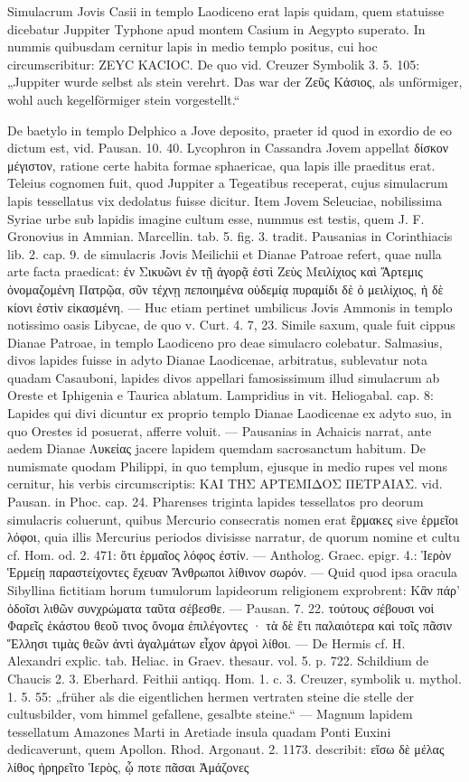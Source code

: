 \documentclass[a4paper, 11pt, oneside, polutonikogreek, german]{article}
\begin{document}
Simulacrum Jovis Casii in templo Laodiceno erat lapis quidam, quem statuisse dicebatur Juppiter Typhone apud montem Casium in Aegypto superato. In nummis quibusdam cernitur lapis in medio templo positus, cui hoc circumscribitur: ZEYC KACIOC. De quo vid. Creuzer Symbolik 3. 5. 105: „Juppiter wurde selbst als stein verehrt. Das war der Ζεῦς Κάσιος, als unförmiger, wohl auch kegelförmiger stein vorgestellt.“

De baetylo in templo Delphico a Jove deposito, praeter id quod in exordio de eo dictum est, vid. Pausan. 10. 40. Lycophron in Cassandra Jovem appellat δίσκον μέγιστον, ratione certe habita formae sphaericae, qua lapis ille praeditus erat. Teleius cognomen fuit, quod Juppiter a Tegeatibus receperat, cujus simulacrum lapis tessellatus vix dedolatus fuisse dicitur. Item Jovem Seleuciae, nobilissima Syriae urbe sub lapidis imagine cultum esse, nummus est testis, quem J. F. Gronovius in Ammian. Marcellin. tab. 5. fig. 3. tradit. Pausanias in Corinthiacis lib. 2. cap. 9. de simulacris Jovis Meilichii et Dianae Patroae refert, quae nulla arte facta praedicat: ἐν Σικυῶνι ἐν τῇ ἀγορᾷ ἐστὶ Ζεὺς Μειλίχιος καὶ Ἄρτεμις ὀνομαζομένη Πατρῷα, σῦν τέχνῃ πεποιημένα οὐδεμίᾳ πυραμίδι δὲ ὁ μειλίχιος, ἡ δὲ κίονι ἐστὶν εἰκασμένη. --- Huc etiam pertinet umbilicus Jovis Ammonis in templo notissimo oasis Libycae, de quo v. Curt. 4. 7, 23. Simile saxum, quale fuit cippus Dianae Patroae, in templo Laodiceno pro deae simulacro colebatur. Salmasius, divos lapides fuisse in adyto Dianae Laodicenae, arbitratus, sublevatur nota quadam Casauboni, lapides divos appellari famosissimum illud simulacrum ab Oreste et Iphigenia e Taurica ablatum. Lampridius in vit. Heliogabal. cap. 8: Lapides qui divi dicuntur ex proprio templo Dianae Laodicenae ex adyto suo, in quo Orestes id posuerat, afferre voluit. --- Pausanias in Achaicis narrat, ante aedem Dianae Λυκείας jacere lapidem quemdam sacrosanctum habitum. De numismate quodam Philippi, in quo templum, ejusque in medio rupes vel mons cernitur, his verbis circumscriptis: ΚΑΙ ΤΗΣ ΑΡΤΕΜΙΔΟΣ ΠΕΤΡΑΙΑΣ. vid. Pausan. in Phoc. cap. 24. Pharenses triginta lapides tessellatos pro deorum simulacris coluerunt, quibus Mercurio consecratis nomen erat ἓρμακες sive ἑρμεῖοι λόφοι, quia illis Mercurius periodos divisisse narratur, de quorum nomine et cultu cf. Hom. od. 2. 471: ὅτι ἑρμαῖος λόφος ἐστίν. --- Antholog. Graec. epigr. 4.: Ἱερὸν Ἑρμείῃ παραστείχοντες ἔχευαν Ἄνθρωποι λίθινον σωρόν. --- Quid quod ipsa oracula Sibyllina fictitiam horum tumulorum lapideorum religionem exprobrent: Κἂν πάρ' ὁδοῖσι λιθῶν συνχρώματα ταῦτα σέβεσθε. --- Pausan. 7. 22. τούτους σέβουσι νοἱ Φαρεῖς ἑκάστου θεοῦ τινος ὄνομα ἐπιλέγοντες · τὰ δὲ ἔτι παλαιότερα καὶ τοῖς πᾶσιν Ἕλλησι τιμὰς θεῶν ἀντὶ ἀγαλμάτων εἶχον ἀργοὶ λίθοι. --- De Hermis cf. H. Alexandri explic. tab. Heliac. in Graev. thesaur. vol. 5. p. 722. Schildium de Chaucis 2. 3. Eberhard. Feithii antiqq. Hom. 1. c. 3. Creuzer, symbolik u. mythol. 1. 5. 55: „früher als die eigentlichen hermen vertraten steine die stelle der cultusbilder, vom himmel gefallene, gesalbte steine.“ --- Magnum lapidem tessellatum Amazones Marti in Aretiade insula quadam Ponti Euxini dedicaverunt, quem Apollon. Rhod. Argonaut. 2. 1173. describit: εἴσω δὲ μέλας λίθος ἠρηρεῖτο Ἱερὸς, ᾧ ποτε πᾶσαι Ἀμάζονες 
\end{document}
